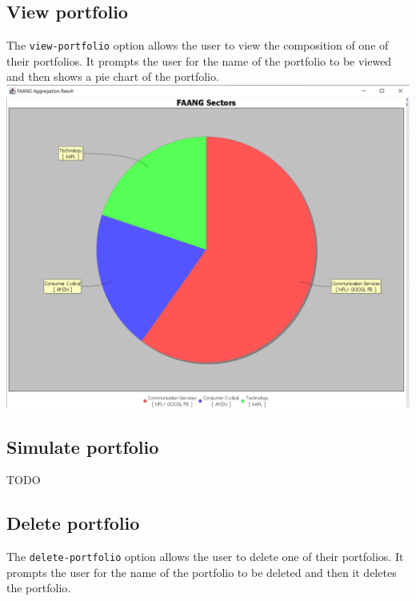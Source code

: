 \subsection{View portfolio}
The \texttt{view-portfolio} option allows the user to view the composition of one of their portfolios. It prompts the user for the name of the portfolio to be viewed and then shows a pie chart of the portfolio.\\

{\centering
\includegraphics[scale=0.32]{img/user_manual/view_portfolio.png}\\
}

\subsection{Simulate portfolio}
TODO

\subsection{Delete portfolio}
The \texttt{delete-portfolio} option allows the user to delete one of their portfolios. It prompts the user for the name of the portfolio to be deleted and then it deletes the portfolio.

